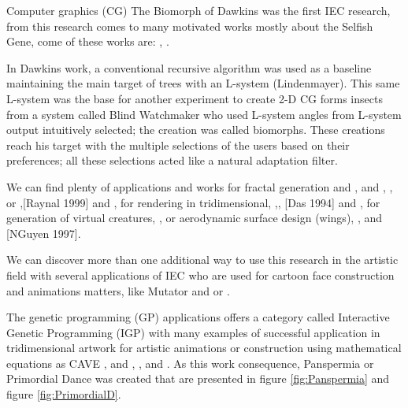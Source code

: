 Computer graphics (CG) The Biomorph of Dawkins was the first IEC research, from
this research comes to many motivated works mostly about the Selfish Gene, come
of these works are:  \cite{ochoa1998genetic},
\cite{mccormack1993interactive}.

In Dawkins work, a conventional recursive algorithm was used as a baseline
maintaining the main target of trees with an L-system (Lindenmayer). This same
L-system was the base for another experiment to create 2-D CG forms insects from
a system called Blind Watchmaker who used L-system angles from L-system output
intuitively selected; the creation was called biomorphs. These creations reach
his target with the multiple selections of the users based on their preferences;
all these selections acted like a natural adaptation filter.

We can find plenty of applications and works for fractal generation and
\cite{sims1992interactive}, \cite{baluja1993simulating} and
\cite{baluja1994towards}, \cite{lund1995artistic}, or
\cite{angeline1996evolving},\cite{raynal1999manipulation}[Raynal 1999] and
\cite{lutton2003artie}, for rendering in tridimensional,
\cite{todd1992artificial},\cite{broughton1997use}, \cite{das1994genetic}[Das
1994] and \cite{tam2002genetic}, for generation of virtual creatures,
\cite{rowland2000evolutionary}, or aerodynamic surface design (wings),
\cite{nguyen1993evolvable}, \cite{nguyen1994evolvable} and \cite{}[NGuyen 1997].

We can discover more than one additional way to use this research in the
artistic field with several applications of IEC who are used for cartoon face
construction and animations matters, like Mutator \cite{todd1994evolutionary}
and \cite{todd1999mutation} or \cite{bentley1999introduction}.

The genetic programming (GP) applications offers a category called Interactive
Genetic Programming (IGP) with many examples of successful application in
tridimensional artwork for artistic animations or construction using
mathematical equations as CAVE \cite{das1994genetic},
\cite{papka1996ubiworld} and \cite{disz1997ubiworld},
\cite{sims1991artificial},
\cite{sims1992interactive} and \cite{min2004creative}. As
this work consequence, Panspermia or Primordial Dance was created that are
presented in figure \ref{fig:Panspermia} and figure \ref{fig:PrimordialD}.

